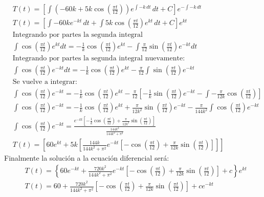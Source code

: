 \begin{align*}
    &T(t)=\left[\int\left( -60k+5k\cos{\left(\frac{\pi t}{12}\right)}\right) e^{\int -k\,dt}\, dt+C\right]e^{-\int -k\,dt}\\ 
    &T(t)=\left[ \int -60ke^{-kt}\, dt+\int 5k\cos{\left(\frac{\pi t}{12}\right)}e^{kt}\,dt+C\right]e^{kt}\\
    &\text{Integrando por partes la segunda integral}\\
    &\int \cos{\left(\frac{\pi t}{12}\right)}e^{kt}dt=-\frac{1}{k}\cos{\left(\frac{\pi t}{12}\right)}e^{kt}-\int  \frac{\pi}{12}\sin{\left(\frac{\pi t}{12}\right)}e^{-kt}dt\\
    &\text{Integrando por partes la segunda integral nuevamente:}\\
    &\int \cos{\left(\frac{\pi t}{12}\right)}e^{-kt}dt=-\frac{1}{k}\cos{\left(\frac{\pi t}{12}\right)}e^{kt}-\frac{\pi}{12}\int \sin{\left(\frac{\pi t}{12}\right)}e^{-kt}\\
    &\text{Se vuelve a integrar:}\\
    &\int \cos{\left(\frac{\pi t}{12}\right)}e^{-kt}=-\frac{1}{k}\cos{\left(\frac{\pi t}{12}\right)}e^{kt}-\frac{\pi}{12}\left[-\frac{1}{k}\sin{\left(\frac{\pi t}{12}\right)}e^{-kt}-\int -\frac{\pi}{12k}\cos{\left(\frac{\pi t}{12}\right)}\right]\\
    &\int \cos{\left(\frac{\pi t}{12}\right)}e^{-kt}=-\frac{1}{k}\cos{\left(\frac{\pi t}{12}\right)}e^{kt}+\frac{\pi}{12k^2}\sin{\left(\frac{\pi t}{12}\right)}e^{-kt}-\frac{\pi}{144k^2}\int \cos{\left(\frac{\pi t}{12}\right)}e^{-kt}\\
    &\int \cos{\left(\frac{\pi t}{12}\right)}e^{-kt}=\frac{e^{-kt}\left[-\frac{1}{k}\cos{\left(\frac{\pi t}{12}\right)}+\frac{\pi}{12k^2}\sin{\left(\frac{\pi t}{12}\right)}\right]}{\frac{144k^2}{144k^2+\pi^2}}\\
    &T(t)=\left[ 60e^{kt}+5k\left[\frac{144k}{144k^2+\pi^2}e^{-kt}\left[-\cos{\left(\frac{\pi t}{12}\right)}+\frac{\pi}{12k}\sin{\left(\frac{\pi t}{12}\right)}\right]\right]\right]
\end{align*}
Finalmente la solución a la ecuación diferencial será:
\begin{align*}
    &T(t)=\left\{60e^{-kt}+\frac{720k^2}{144k^2+\pi^2}e^{-kt}\left[-\cos{\left(\frac{\pi t}{12}\right)}+\frac{\pi}{12k}\sin{\left(\frac{\pi t}{12}\right)}\right]+c\right\}e^{kt}\\
    &T(t)=60+\frac{720k^2}{144k^2+\pi^2}\left[-\cos{\left(\frac{\pi t}{12}\right)}+\frac{\pi}{12k}\sin{\left(\frac{\pi t}{12}\right)}\right]+ce^{-kt}
\end{align*}

